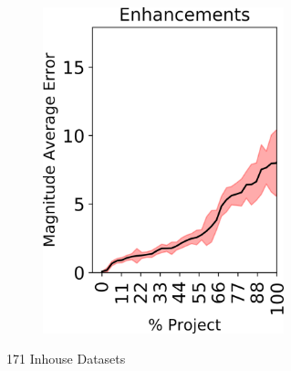 \begin{figure}[tp!]
\begin{subfigure}[t]{\linewidth}
\begin{subfigure}[t]{0.33\linewidth}
		\includegraphics[width=\linewidth]{images/RQ1/inhouse/Enhancements.png}
	\end{subfigure}%
	\caption{171 Inhouse Datasets}
	\end{subfigure}
	\\
	\begin{subfigure}[t]{\linewidth}
	\begin{subfigure}[t]{0.33\linewidth}
	\centering

\end{subfigure}
\end{subfigure}
\end{figure}
